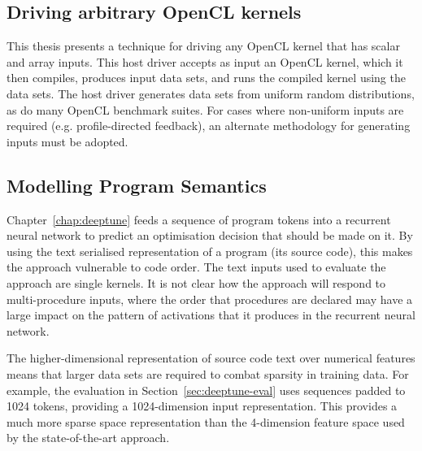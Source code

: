 \subsection{Driving arbitrary OpenCL kernels}

This thesis presents a technique for driving any OpenCL kernel that has scalar and array inputs. This host driver accepts as input an OpenCL kernel, which it then compiles, produces input data sets, and runs the compiled kernel using the data sets. The host driver generates data sets from uniform random distributions, as do many OpenCL benchmark suites. For cases where non-uniform inputs are required (e.g. profile-directed feedback), an alternate methodology for generating inputs must be adopted.






\subsection{Modelling Program Semantics}

Chapter~\ref{chap:deeptune} feeds a sequence of program tokens into a recurrent neural network to predict an optimisation decision that should be made on it. By using the text serialised representation of a program (its source code), this makes the approach vulnerable to code order. The text inputs used to evaluate the approach are single kernels. It is not clear how the approach will respond to multi-procedure inputs, where the order that procedures are declared may have a large impact on the pattern of activations that it produces in the recurrent neural network.



The higher-dimensional representation of source code text over numerical features means that larger data sets are required to combat sparsity in training data. For example, the evaluation in Section~\ref{sec:deeptune-eval} uses sequences padded to 1024 tokens, providing a 1024-dimension input representation. This provides a much more sparse space representation than the 4-dimension feature space used by the state-of-the-art approach.

